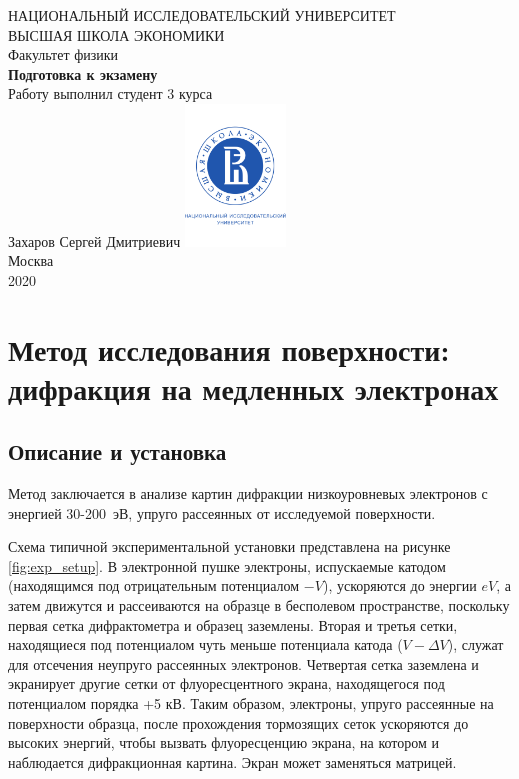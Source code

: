 \documentclass[a4paper, 12pt]{article}
\begin{document}
	\begin{titlepage}
		\begin{center}
			$$$$
			$$$$
			$$$$
			$$$$
			{\Large{НАЦИОНАЛЬНЫЙ ИССЛЕДОВАТЕЛЬСКИЙ УНИВЕРСИТЕТ}}\\
			\vspace{0.1cm}
			{\Large{ВЫСШАЯ ШКОЛА ЭКОНОМИКИ}}\\
			\vspace{0.25cm}
			{\large{Факультет физики}}\\
			\vspace{5.5cm}
			{\Huge\textbf{{Подготовка к экзамену}}}\\%
			\vspace{1cm}
			\vspace{2cm}
			{Работу выполнил студент 3 курса}\\
			{Захаров Сергей Дмитриевич}
			\vfill
			\includegraphics[width = 0.2\textwidth]{HSElogo}\\
			\vfill
			Москва\\
			2020
		\end{center}
	\end{titlepage}
	
\tableofcontents

\newpage

\section{Метод исследования поверхности: дифракция на медленных электронах}

\subsection{Описание и установка}

Метод заключается в анализе картин дифракции низкоуровневых электронов с энергией 30-200~эВ, упруго рассеянных от исследуемой поверхности.

Схема типичной экспериментальной установки представлена на рисунке \ref{fig:exp_setup}. В электронной пушке электроны, испускаемые катодом (находящимся под отрицательным потенциалом $-V$), ускоряются до энергии $eV$, а затем движутся и рассеиваются на образце в бесполевом пространстве, поскольку первая сетка дифрактометра и образец заземлены. Вторая и третья сетки, находящиеся под потенциалом чуть меньше потенциала катода ($V - \Delta V$), служат для отсечения неупруго рассеянных электронов. Четвертая сетка заземлена и экранирует другие сетки от флуоресцентного экрана, находящегося под потенциалом порядка +5 кВ. Таким образом, электроны, упруго рассеянные на поверхности образца, после прохождения тормозящих сеток ускоряются до высоких энергий, чтобы вызвать флуоресценцию экрана, на котором и наблюдается дифракционная картина. Экран может заменяться матрицей.
\end{document}

